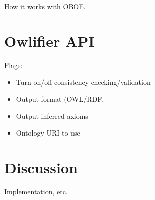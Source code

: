\documentclass[11pt,onecolumn]{article}
\begin{document}
How it works with OBOE.


\section{\textsf{Owlifier} API}

Flags:
\begin{itemize}
\item Turn on/off consistency checking/validation
\item Output format (OWL/RDF, 
\item Output inferred axioms
\item Ontology URI to use
\end{itemize}


\section{Discussion}

Implementation, etc.




\end{document}
